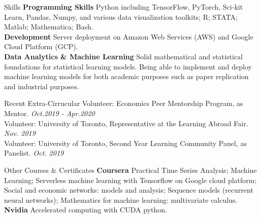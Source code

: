 \documentclass{resume} %
\begin{document}
\begin{rSection}{Skills}
\textbf{Programming Skills} Python including TensorFlow, PyTorch, Sci-kit Learn, Pandas, Numpy, and various data visualization toolkits; R; STATA; Matlab; Mathematica; Bash.
\\\textbf{Development} Server deployment on Amazon Web Services (AWS) and Google Cloud Platform (GCP).
\\\textbf{Data Analytics \& Machine Learning} Solid mathematical and statistical foundations for statistical learning models. Being able to implement and deploy machine learning models for both academic purposes such as paper replication and industrial purposes.
\end{rSection}

\begin{rSection}{Recent Extra-Cirrucular} 
	Volunteer: Economics Peer Mentorship Program, as Mentor. \hfill \emph{Oct.2019 - Apr.2020}
	\\
	Volunteer: University of Toronto, Representative at the Learning Abroad Fair. \hfill \emph{Nov. 2019}
	\\
	Volunteer: University of Toronto, Second Year Learning Community Panel, as Panelist. \hfill \emph{Oct. 2019}
\end{rSection}

\begin{rSection}{Other Courses \& Certificates}
	\textbf{Coursera} Practical Time Series Analysis; Machine Learning; Serverless machine learning with Tensorflow on Google cloud platform; Social and economic networks: models and analysis; Sequence models (recurrent neural networks); Mathematics for machine learning: multivariate calculus.
	\\
	\textbf{Nvidia} Accelerated computing with CUDA python.
\end{rSection}


%
%
%
\end{document}
